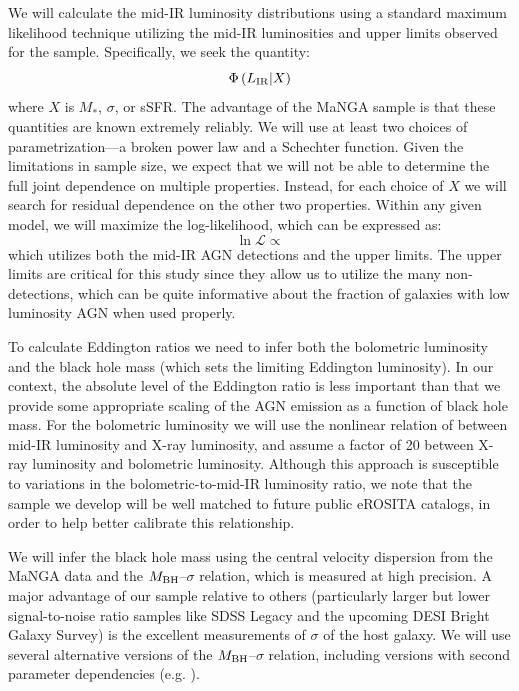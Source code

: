 \documentclass[12pt, preprint]{hacked-aastex}
\begin{document}
We will calculate the mid-IR luminosity distributions using a standard
maximum likelihood technique utilizing the mid-IR luminosities and
upper limits observed for the sample. Specifically, we seek the
quantity:
\begin{equation}
\Phi\left(L_{\rm IR} | X\right)
\end{equation}
where $X$ is $M_\ast$, $\sigma$, or sSFR. The advantage of the MaNGA
sample is that these quantities are known extremely reliably. We will
use at least two choices of parametrization---a broken power law and a
Schechter function. Given the limitations in sample size, we expect
that we will not be able to determine the full joint dependence on
multiple properties. Instead, for each choice of $X$ we will search
for residual dependence on the other two properties. Within any given
model, we will maximize the log-likelihood, which can be expressed as:
\begin{equation}
\ln \mathcal{L} \propto 
\end{equation}
which utilizes both the mid-IR AGN detections and the upper
limits. The upper limits are critical for this study since they allow
us to utilize the many non-detections, which can be quite informative
about the fraction of galaxies with low luminosity AGN when used
properly.

To calculate Eddington ratios we need to infer both the bolometric
luminosity and the black hole mass (which sets the limiting Eddington
luminosity). In our context, the absolute level of the Eddington ratio
is less important than that we provide some appropriate scaling of the
AGN emission as a function of black hole mass.  For the bolometric
luminosity we will use the nonlinear relation of \cite{stern15a}
between mid-IR luminosity and X-ray luminosity, and assume a factor of
20 between X-ray luminosity and bolometric luminosity. Although this
approach is susceptible to variations in the bolometric-to-mid-IR
luminosity ratio, we note that the sample we develop will be well
matched to future public eROSITA catalogs, in order to help better
calibrate this relationship.

We will infer the black hole mass using the central velocity
dispersion from the MaNGA data and the $M_{\rm BH}$--$\sigma$
relation, which is measured at high precision.  A major advantage of
our sample relative to others (particularly larger but lower
signal-to-noise ratio samples like SDSS Legacy and the upcoming DESI
Bright Galaxy Survey) is the excellent measurements of $\sigma$ of the
host galaxy. We will use several alternative versions of the $M_{\rm
  BH}$--$\sigma$ relation, including versions with second parameter
dependencies (e.g. \cite{kormendy13a, vandenbosch16a}).
\end{document}

